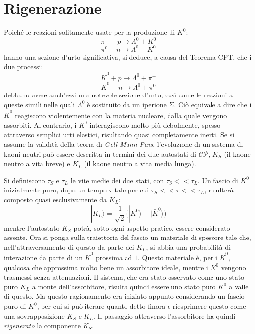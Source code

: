 \section{Rigenerazione}
\noindent
Poiché le reazioni solitamente usate per la produzione di $K^0$:
\begin{equation}
 \pi^- + p \rightarrow \Lambda^0 + K^0
\end{equation}
\begin{equation}
 \pi^0 + n \rightarrow \Lambda^0 + K^0
\end{equation}
hanno una sezione d'urto significativa, si deduce, a causa del Teorema CPT, che i due processi:
\begin{equation}
\bar{K}^0 + p \rightarrow \Lambda^0 + \pi^+
\end{equation}
\begin{equation}
\bar{K}^0 + n \rightarrow \Lambda^0 + \pi^0
\end{equation}
debbano avere anch'essi una notevole sezione d'urto, così come le reazioni a queste simili nelle quali $\Lambda^0$ è sostituito da un iperione $\Sigma$. 
Ciò equivale a dire che i $\bar{K}^0$ reagiscono violentemente con la materia nucleare, dalla quale vengono assorbiti. 
Al contrario, i $K^0$ interagiscono molto più debolmente, spesso attraverso semplici urti elastici, risultando quasi completamente inerti.
Se si assume la validità della teoria di \emph{Gell-Mann Pais}, l'evoluzione di un sistema di kaoni neutri può essere descritta in termini dei due autostati di $\mathscr{CP}$, 
$K_S$ (il kaone neutro a vita breve) e $K_L$ (il kaone neutro a vita media lunga).

Si definiscono $\tau_S$ e $\tau_L$ le vite medie dei due stati, con $\tau_S << \tau_L$.
Un fascio di $K^0$ inizialmente puro, dopo un tempo $\tau$ tale per cui $\tau_S << \tau << \tau_L$, risulterà composto quasi esclusivamente da $K_L$:
\begin{equation}
 |K_L\rangle = \frac{1}{\sqrt{2}}\big(|K^0\rangle - |\bar{K}^0\rangle\big)
\end{equation}
mentre l'autostato $K_S$ potrà, sotto ogni aspetto pratico, essere considerato assente.
Ora si ponga sulla traiettoria del fascio un materiale di spessore tale che, nell'attraversamento di questo da parte dei $K_L$, si abbia una probabilità di interazione
da parte di un $\bar{K}^0$ prossima ad $1$. Questo materiale è, per i $\bar{K}^0$, qualcosa che approssima molto bene un assorbitore ideale, mentre i $K^0$ vengono trasmessi
senza attenuazioni. Il sistema, che era stato osservato come uno stato puro $K_L$ a monte dell'assorbitore, risulta quindi essere uno stato puro $K^0$ a valle di questo.
Ma questo ragionamento era iniziato appunto considerando un fascio puro di $K^0$, per cui si può iterare quanto detto finora e riesprimere questo come una sovrapposizione
$K_S$ e $K_L$. Il passaggio attraverso l'assorbitore ha quindi \emph{rigenerato} la componente $K_S$. 

